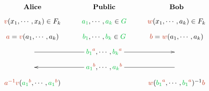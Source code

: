 \documentclass{standalone}
\newcommand{\pri}[1]{{\textcolor{darkpastelred}{#1}}}
\newcommand{\pub}[1]{{\textcolor{darkpastelgreen}{#1}}}
\begin{document}
    $$
    \xymatrix@R-1.5pc{
    \textbf{Alice}                                              & \textbf{Public}                              & \textbf{Bob}                        \\
    \pri{v}(x_1, \cdots, x_k) \in F_k                           & \pub{a_1}, \cdots, \pub{a_k} \in \pub{G}     & \pri{w}(x_1, \cdots, a_k) \in F_k   \\
    \pri{a} = \pri{v}(a_1, \cdots, a_k)                         & \pub{b_1}, \cdots, \pub{b_k} \in \pub{G}     & \pri{b} = \pri{w}(a_1, \cdots, a_k) \\
    \ar '[r] [rr]                                               & \pub{b_1}^\pri{a}, \cdots, \pub{b_k}^\pri{a} &                                     \\
                                                                & \pub{a_1}^\pri{b}, \cdots, \pub{a_k}^\pri{b} & \ar '[l] [ll]                       \\
    \pri{a^{-1}v}(\pub{a_1}^\pri{b}, \cdots, \pub{a_1}^\pri{b}) &                                              &
    \pri{w}(\pub{b_1}^\pri{a}, \cdots, \pub{b_1}^\pri{a})^{-1}\pri{b}
    }
    $$
\end{document}
